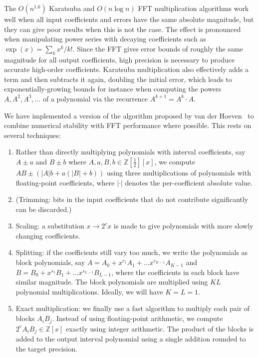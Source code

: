 \documentclass[10pt,journal,compsoc,cspaper]{IEEEtran}
\begin{document}
The $O(n^{1.6})$ Karatsuba and $O(n \log n)$ FFT multiplication
algorithms work well when all input coefficients
and errors have the same absolute
magnitude, but they can give poor results when this
is not the case. The
effect is pronounced when manipulating power series with
decaying coefficients such as $\exp(x) = \sum_k x^k / k!$. Since the
FFT gives error bounds of roughly the same magnitude for all output
coefficients, high precision is necessary to produce accurate
high-order coefficients. Karatsuba multiplication
also effectively adds a term and then subtracts it again,
doubling the initial error, which leads to exponentially-growing
bounds for instance when computing
the powers $A, A^2, A^3, \ldots$ of a polynomial
via the recurrence $A^{k+1} = A^k \cdot A$.

We have implemented a version of the algorithm proposed by van der
Hoeven~\cite{vdH:stablemult} to combine numerical stability with FFT performance where
possible. This rests on several techniques:

\begin{enumerate}
\item Rather than directly multiplying polynomials with interval coefficients,
say $A \pm a$ and $B \pm b$ where $A, a, B, b \in \mathbb{Z}[\tfrac{1}{2}][x]$,
we compute $A B \pm (|A| b + a (|B| + b))$ using three multiplications
of polynomials with floating-point coefficients, where $|\cdot|$ denotes
the per-coefficient absolute value.
\item (Trimming: bits in the input coefficients that do not
contribute significantly can be discarded.)
\item Scaling: a substitution $x \to 2^c x$ is made to give
polynomials with more slowly changing coefficients.
\item Splitting: if the coefficients still vary too much, we write the
polynomials as block polynomials, say $A = A_0 + x^{r_1} A_1 + \ldots
x^{r_{K-1}} A_{K-1}$ and $B = B_0 + x^{s_1} B_1 + \ldots x^{s_{L-1}} B_{L-1}$, where
the coefficients in each block have similar magnitude. The block
polynomials are multiplied using $KL$ polynomial multiplications.
Ideally, we will have $K = L = 1$.
\item Exact multiplication: we finally use a fast algorithm to
multiply each pair of blocks $A_i B_j$. Instead of using
floating-point arithmetic, we compute $2^e A_i B_j \in \mathbb{Z}[x]$
exactly using integer arithmetic.
The product of the blocks is
added to the output interval polynomial using a single addition rounded to the
target precision.
\end{enumerate}
\end{document}
